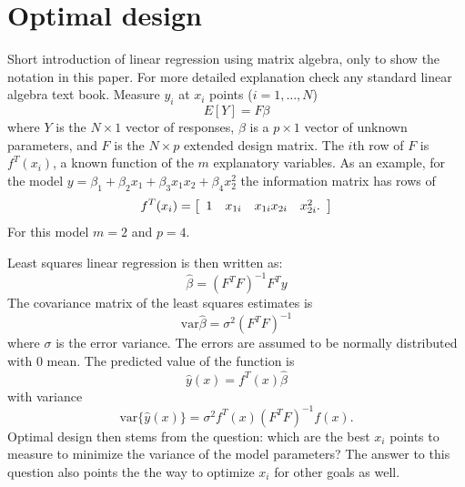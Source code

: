 \documentclass[12pt]{iopart}
\begin{document}
\section{Optimal design}
Short introduction of linear regression using matrix algebra, only to show the notation in this paper. For more detailed explanation check any standard linear algebra text book. Measure $y_i$ at $x_i$ points ($i=1, \ldots, N$)
\begin{equation}
E[Y] = F \beta
\end{equation}
where $Y$ is the $N \times 1$ vector of responses, $\beta$ is a $p \times 1$ vector of unknown parameters, and $F$ is the $N \times p$ extended design matrix. The $i$th row of $F$ is $f^T(x_i)$, a known function of the $m$ explanatory variables. As an example, for the model $y = \beta_1 + \beta_2 x_1 + \beta_3 x_1 x_2 + \beta_4 x_2^2$ the information matrix has rows of
\begin{equation}
f^T(x_i) = \left[
	\begin{array}{c c c c}
	1 & x_{1i} & x_{1i}x_{2i} & x_{2i}^2.
	\end{array}\right]
\end{equation}
For this model $m = 2$ and $p = 4$.



Least squares linear regression is then written as:
\begin{equation}
\hat \beta = (F^T F)^{-1} F^T y
\end{equation}
The covariance matrix of the least squares estimates is
\begin{equation}
\mathrm{var} \hat \beta = \sigma^2 (F^T F)^{-1}
\label{eq:varbeta}
\end{equation}
where $\sigma$ is the error variance. The errors are assumed to be normally distributed with 0 mean. The predicted value of the function is
\begin{equation}
\hat y(x) = f^T(x) \hat \beta
\end{equation}
with variance
\begin{equation}
\mathrm{var}\{\hat y(x)\} = \sigma^2 f^T(x)\left(F^T F\right)^{-1}f(x).
\end{equation}
Optimal design then stems from the question: which are the best $x_i$ points to measure to minimize the variance of the model parameters? The answer to this question also points the the way to optimize $x_i$ for other goals as well.
\end{document}
